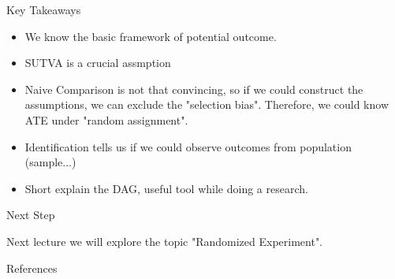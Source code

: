 \documentclass[11pt,aspectratio=169]{beamer}
\begin{document}
\begin{frame}{Key Takeaways}

\begin{itemize}
    \item We know the basic framework of potential outcome.
    \item SUTVA is a crucial assmption
    \item Naive Comparison is not that convincing, so if we could construct the assumptions, we can exclude the "selection bias". Therefore, we could know ATE under "random assignment".
    \item Identification tells us if we could observe outcomes from population (sample...)
    \item Short explain the DAG, useful tool while doing a research.
\end{itemize}


\end{frame}



\begin{frame}{Next Step}
\begin{importantbox}
Next lecture we will explore the topic "Randomized Experiment". 
\end{importantbox}
\end{frame}


\begin{frame}[allowframebreaks]{References}
    \small
    \nocite{CunninghamScott2021Ci:t,wager2024causal}
    \printbibliography[heading=none]
\end{frame}
\end{document}
